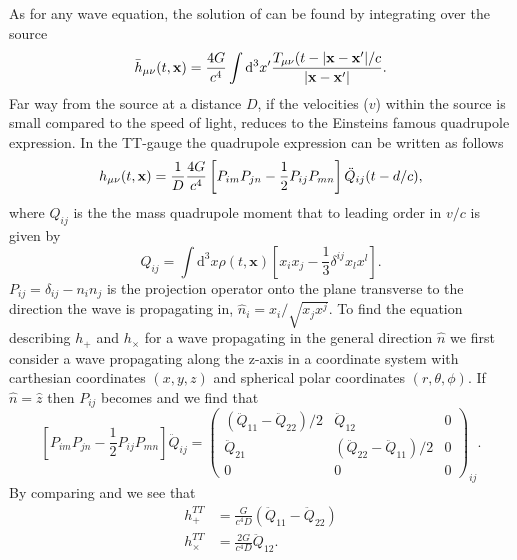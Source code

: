As for any wave equation, the solution of  can be found by integrating over the source
\begin{equation} \label{eqT:sol}
\bar{h}_{\mu\nu}(t,\mathbf{x}) = \frac{4G}{c^4} \int \mathrm{d}^3 x' \frac{T_{\mu\nu}(t-|\mathbf{x}-\mathbf{x'}|/c}{|\mathbf{x}-\mathbf{x'}|}.
\end{equation}
Far way from the source at a distance $D$, if the velocities ($v$) within the source is small compared to the speed of light,  reduces to the Einsteins famous quadrupole expression. In the TT-gauge the quadrupole expression can be written as follows  
\begin{equation} \label{eqT:equad}
h_{\mu\nu}(t,\mathbf{x}) = \frac{1}{D} \frac{4G}{c^4} \left [P_{im} P_{jn} - \frac{1}{2} P_{ij} P_{mn} \right ] \ddot{Q}_{ij} (t -d/c),
\end{equation}
where $Q_{ij}$ is the the mass quadrupole moment that to leading order in $v/c$ is given by
\begin{equation} \label{eqT:quad}
Q_{ij} = \int \mathrm{d}^3 x \rho(t,\mathbf{x})\left [x_i x_j - \frac{1}{3} \delta^{ij} x_l x^l \right ].
\end{equation}
$P_{ij} = \delta_{ij} -n_i n_j$ is the projection operator onto the plane transverse to the direction the wave is propagating in,
$\hat{n}_i = x_i / \sqrt{x_j x^j}$. To find the equation describing $h_{+}$ and $h_{\times}$ for a wave propagating in the general direction
$\hat{n}$ we first consider a wave propagating along the z-axis in a coordinate system with carthesian coordinates $(x,y,z)$ and
spherical polar coordinates $(r,\theta,\phi)$. 
If $\hat{n} = \hat{z}$ then $P_{ij}$ becomes and we find that 
\begin{equation} \label{eqT:pjz}
\left [P_{im} P_{jn} - \frac{1}{2} P_{ij} P_{mn} \right ] \ddot{Q}_{ij} = 
  \begin{pmatrix}
    (\ddot{Q}_{11}-\ddot{Q}_{22})/2 & \ddot{Q}_{12} & 0  \\
    \ddot{Q}_{21} & (\ddot{Q}_{22} - \ddot{Q}_{11})/2 & 0 \\
    0 & 0 & 0
  \end{pmatrix}_{ij}.
\end{equation}
By comparing  and  we see that
\begin{align} \label{eqT:zhchx}
h_{+}^{TT} &= \frac{G}{c^4 D} (\ddot{Q}_{11}-\ddot{Q}_{22}) \\ \nonumber
h_{\times}^{TT} &= \frac{2G}{c^4 D} \ddot{Q}_{12}.
\end{align}
